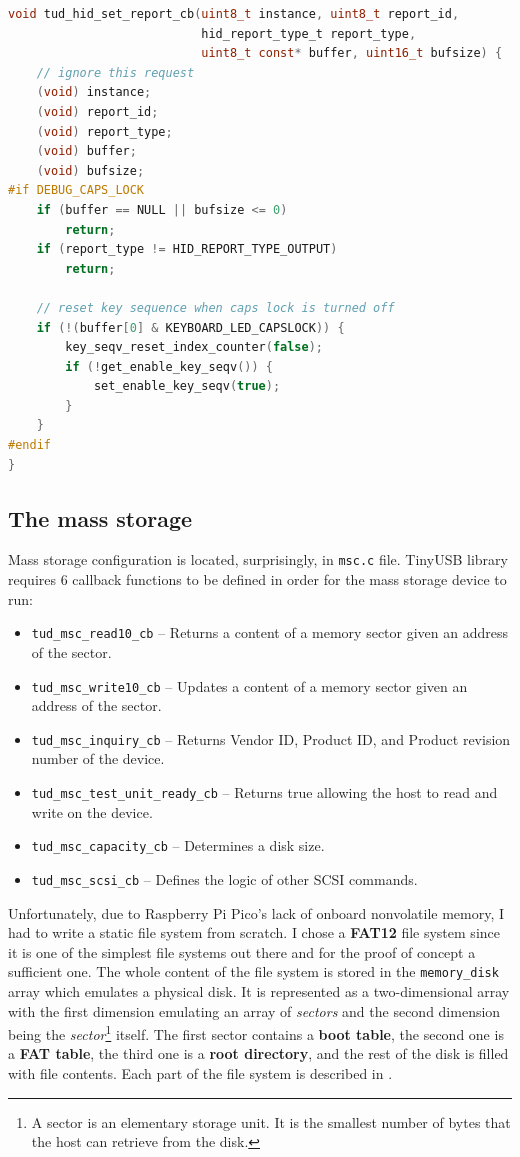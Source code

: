 \begin{lstlisting}[caption={A snippet of code which implements the payload re-execution.},
                   label={lst:usb_debug},
                   language=c]
void tud_hid_set_report_cb(uint8_t instance, uint8_t report_id,
                           hid_report_type_t report_type,
                           uint8_t const* buffer, uint16_t bufsize) {
    // ignore this request
    (void) instance;
    (void) report_id;
    (void) report_type;
    (void) buffer;
    (void) bufsize;
#if DEBUG_CAPS_LOCK
    if (buffer == NULL || bufsize <= 0)
        return;
    if (report_type != HID_REPORT_TYPE_OUTPUT)
        return;

    // reset key sequence when caps lock is turned off
    if (!(buffer[0] & KEYBOARD_LED_CAPSLOCK)) {
        key_seqv_reset_index_counter(false);
        if (!get_enable_key_seqv()) {
            set_enable_key_seqv(true);
        }
    }
#endif
}
\end{lstlisting}

\subsection{The mass storage}
Mass storage configuration is located, surprisingly, in \verb|msc.c| file. TinyUSB library requires 6 callback functions to be defined in order for the mass storage device to run:
\begin{itemize}
    \item \verb|tud_msc_read10_cb| -- Returns a content of a memory sector given an address of the sector.
    \item \verb|tud_msc_write10_cb| -- Updates a content of a memory sector given an address of the sector.
    \item \verb|tud_msc_inquiry_cb| -- Returns Vendor ID, Product ID, and Product revision number of the device.
    \item \verb|tud_msc_test_unit_ready_cb| -- Returns true allowing the host to read and write on the device.
    \item \verb|tud_msc_capacity_cb| -- Determines a disk size.
    \item \verb|tud_msc_scsi_cb| -- Defines the logic of other SCSI commands.
\end{itemize}
Unfortunately, due to Raspberry Pi Pico's lack of onboard nonvolatile memory, I had to write a static file system from scratch. I chose a \textbf{FAT12} file system since it is one of the simplest file systems out there and for the proof of concept a sufficient one. The whole content of the file system is stored in the \verb|memory_disk| array which emulates a physical disk. It is represented as a two-dimensional array with the first dimension emulating an array of \emph{sectors} and the second dimension being the \emph{sector}\footnote{A sector is an elementary storage unit. It is the smallest number of bytes that the host can retrieve from the disk.} itself. The first sector contains a \textbf{boot table}, the second one is a \textbf{FAT table}, the third one is a \textbf{root directory}, and the rest of the disk is filled with file contents. Each part of the file system is described in \cite{fatFS}.

